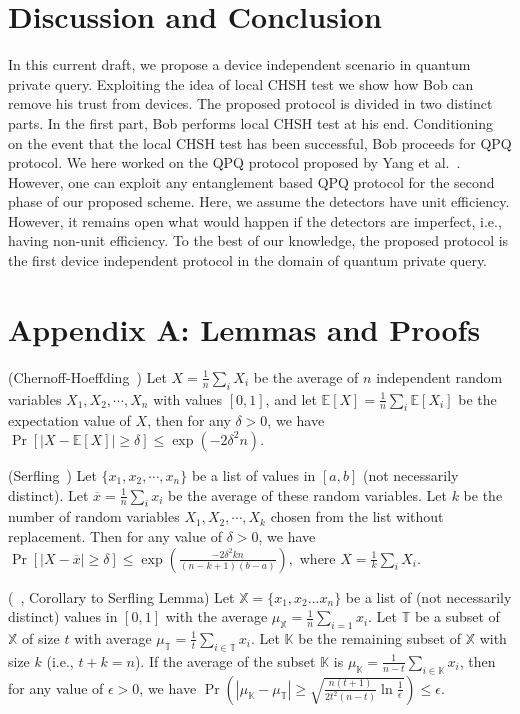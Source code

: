 \documentclass[twocolumn,pra,aps,amssymb]{revtex4}
\begin{document}
\section{Discussion and Conclusion}
In this current draft, we propose a device independent scenario in quantum private query. Exploiting the idea of local CHSH test we show how Bob can remove his trust from devices. The proposed protocol is divided in two distinct parts. In the first part, Bob performs local CHSH test at his end. Conditioning on the event that the local CHSH test has been successful, Bob proceeds for QPQ protocol. We here worked on the QPQ protocol proposed by Yang et al.~\cite{Yang}. However, one can exploit any entanglement based QPQ protocol for the second phase of our proposed scheme. Here, we assume the detectors have unit efficiency. However, it remains open what would happen if the detectors are imperfect, i.e., having non-unit efficiency. To the best of our knowledge, the proposed protocol is the first device independent protocol in the domain of quantum private query.   


\section{Appendix A: Lemmas and Proofs}
\begin{lemma}(Chernoff-Hoeffding~\cite{Chernoff})
Let $X=\frac{1}{n}\sum_i{X_i}$ be the average of $n$ independent random variables $X_1, X_2,\cdots,X_n$ with values $[0,1]$, and let $\mathbb{E}[X]=\frac{1}{n}\sum_i{\mathbb{E}[X_i]}$ be the expectation value of $X$, then for any 
$\delta>0$, we have $\Pr\left[|X-\mathbb{E}[X]| \geq \delta \right] \leq \exp(-2\delta^2 n).$
\end{lemma}
\begin{lemma}(Serfling~\cite{Serfling}) 
Let $\{x_1,x_2,\cdots,x_n\}$ be a list of values in $[a,b]$ (not necessarily distinct). Let $\overline{x}=\frac{1}{n}\sum_i x_i$ be the average of these random variables. Let $k$ be the number of random variables $X_1,X_2,\cdots,X_k$ chosen from the list without replacement. Then for any value of $\delta>0$, we have
$\Pr\left[|X-\overline{x}| \geq \delta \right] \leq \exp\left(\frac{-2\delta^2 kn}{(n-k+1)(b-a)}\right),$ where $X=\frac{1}{k}\sum_i X_i$.
\end{lemma}
\begin{lemma}(~\cite{Lim}, Corollary to Serfling Lemma)
Let $\mathbb{X}=\{x_1,x_2...x_n\}$ be a list of (not necessarily distinct) values in $[0,1]$ with the average $\mu_{\mathbb{X}}=\frac{1}{n}\sum_{i=1}x_i$. Let $\mathbb{T}$ be a subset of $\mathbb{X}$ of size $t$ with average $\mu_{\mathbb{T}}=\frac{1}{t}\sum_{i\in\mathbb{T}}x_i$. Let $\mathbb{K}$ be the remaining subset of $\mathbb{X}$ with size $k$ (i.e., $t+k=n$). If the average of the subset $\mathbb{K}$ is $\mu_{\mathbb{K}}=\frac{1}{n-t}\sum_{i\in\mathbb{K}}x_i$, then 
for any value of $\epsilon > 0$, we have
$\Pr\left(|\mu_{\mathbb{K}}-\mu_{\mathbb{T}}| \geq \sqrt{\frac{n(t+1)}{2t^2(n-t)}\ln{\frac{1}{\epsilon}}}\right) \leq \epsilon.$
\end{lemma}
\end{document}
